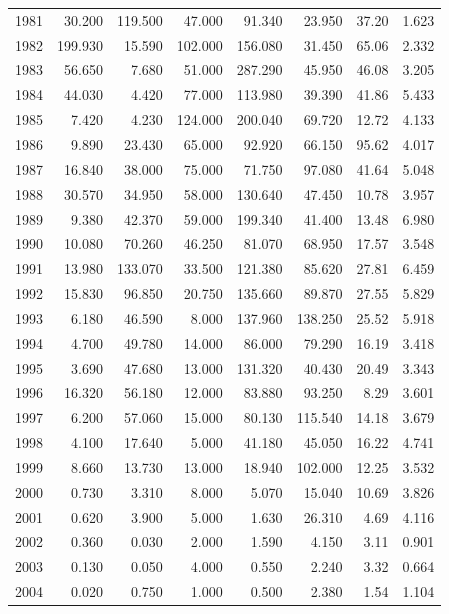 \documentclass[
]{scrartcl}
\begin{document}
\begin{longtable}{rrrrrrrr}
1981 & 30.200 & 119.500 & 47.000 & 91.340 & 23.950 & 37.20 & 1.623 \\ 
1982 & 199.930 & 15.590 & 102.000 & 156.080 & 31.450 & 65.06 & 2.332 \\ 
1983 & 56.650 & 7.680 & 51.000 & 287.290 & 45.950 & 46.08 & 3.205 \\ 
1984 & 44.030 & 4.420 & 77.000 & 113.980 & 39.390 & 41.86 & 5.433 \\ 
1985 & 7.420 & 4.230 & 124.000 & 200.040 & 69.720 & 12.72 & 4.133 \\ 
1986 & 9.890 & 23.430 & 65.000 & 92.920 & 66.150 & 95.62 & 4.017 \\ 
1987 & 16.840 & 38.000 & 75.000 & 71.750 & 97.080 & 41.64 & 5.048 \\ 
1988 & 30.570 & 34.950 & 58.000 & 130.640 & 47.450 & 10.78 & 3.957 \\ 
1989 & 9.380 & 42.370 & 59.000 & 199.340 & 41.400 & 13.48 & 6.980 \\ 
1990 & 10.080 & 70.260 & 46.250 & 81.070 & 68.950 & 17.57 & 3.548 \\ 
1991 & 13.980 & 133.070 & 33.500 & 121.380 & 85.620 & 27.81 & 6.459 \\ 
1992 & 15.830 & 96.850 & 20.750 & 135.660 & 89.870 & 27.55 & 5.829 \\ 
1993 & 6.180 & 46.590 & 8.000 & 137.960 & 138.250 & 25.52 & 5.918 \\ 
1994 & 4.700 & 49.780 & 14.000 & 86.000 & 79.290 & 16.19 & 3.418 \\ 
1995 & 3.690 & 47.680 & 13.000 & 131.320 & 40.430 & 20.49 & 3.343 \\ 
1996 & 16.320 & 56.180 & 12.000 & 83.880 & 93.250 & 8.29 & 3.601 \\ 
1997 & 6.200 & 57.060 & 15.000 & 80.130 & 115.540 & 14.18 & 3.679 \\ 
1998 & 4.100 & 17.640 & 5.000 & 41.180 & 45.050 & 16.22 & 4.741 \\ 
1999 & 8.660 & 13.730 & 13.000 & 18.940 & 102.000 & 12.25 & 3.532 \\ 
2000 & 0.730 & 3.310 & 8.000 & 5.070 & 15.040 & 10.69 & 3.826 \\ 
2001 & 0.620 & 3.900 & 5.000 & 1.630 & 26.310 & 4.69 & 4.116 \\ 
2002 & 0.360 & 0.030 & 2.000 & 1.590 & 4.150 & 3.11 & 0.901 \\ 
2003 & 0.130 & 0.050 & 4.000 & 0.550 & 2.240 & 3.32 & 0.664 \\ 
2004 & 0.020 & 0.750 & 1.000 & 0.500 & 2.380 & 1.54 & 1.104 \\ 

\end{longtable}
\end{document}
